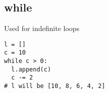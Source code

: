 \subsection{while}
Used for indefinite loops

\begin{lstlisting}
l = []
c = 10
while c > 0:
  l.append(c)
  c -= 2
# l will be [10, 8, 6, 4, 2]
\end{lstlisting}
